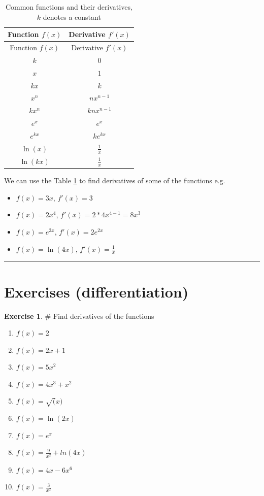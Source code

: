 \documentclass[
]{book}
\providecommand{\tightlist}{%
  \setlength{\itemsep}{0pt}\setlength{\parskip}{0pt}}
\theoremstyle{definition}
\theoremstyle{definition}
\theoremstyle{definition}
\newtheorem{exercise}{Exercise}[chapter]
\theoremstyle{remark}
\begin{document}
\begin{longtable}[]{@{}cc@{}}
\caption{\label{tab:diff-table} Common functions and their derivatives, \(k\) denotes a constant}\tabularnewline
\toprule
Function \(f(x)\) & Derivative \(f'(x)\)\tabularnewline
\midrule
\endfirsthead
\toprule
Function \(f(x)\) & Derivative \(f'(x)\)\tabularnewline
\midrule
\endhead
\(k\) & \(0\)\tabularnewline
\(x\) & \(1\)\tabularnewline
\(kx\) & \(k\)\tabularnewline
\(x^n\) & \(nx^{n-1}\)\tabularnewline
\(kx^n\) & \(knx^{n-1}\)\tabularnewline
\(e^x\) & \(e^x\)\tabularnewline
\(e^{kx}\) & \(ke^{kx}\)\tabularnewline
\(\ln(x)\) & \(\frac{1}{x}\)\tabularnewline
\(\ln(kx)\) & \(\frac{1}{x}\)\tabularnewline
\bottomrule
\end{longtable}

We can use the Table \ref{tab:diff-table} to find derivatives of some of the functions e.g.

\begin{itemize}
\tightlist
\item
  \(f(x) = 3x\), \(f'(x) = 3\)
\item
  \(f(x) = 2x^4\), \(f'(x) = 2*4x^{4-1} = 8x^3\)
\item
  \(f(x) = e^{2x}\), \(f'(x) = 2e^{2x}\)
\item
  \(f(x) = \ln(4x)\), \(f'(x) = \frac{1}{x}\)
\end{itemize}

\begin{center}\rule{0.5\linewidth}{0.5pt}\end{center}

\hypertarget{exercises-differentiation}{%
\section{Exercises (differentiation)}\label{exercises-differentiation}}

\begin{exercise}
\protect\hypertarget{exr:m-diff}{}{\label{exr:m-diff} }
\# Find derivatives of the functions

\begin{enumerate}
\def\labelenumi{\alph{enumi})}
\tightlist
\item
  \(f(x) = 2\)
\item
  \(f(x) = 2x + 1\)
\item
  \(f(x) = 5x^2\)
\item
  \(f(x) = 4x^3 + x^2\)
\item
  \(f(x) = \sqrt(x)\)
\item
  \(f(x) = \ln(2x)\)
\item
  \(f(x) = e^{x}\)
\item
  \(f(x) = \frac{9}{x^2} + ln(4x)\)
\item
  \(f(x) = 4x−6x^6\)
\item
  \(f(x) = \frac{3}{x^2}\)
\end{enumerate}
\end{exercise}
\end{document}
